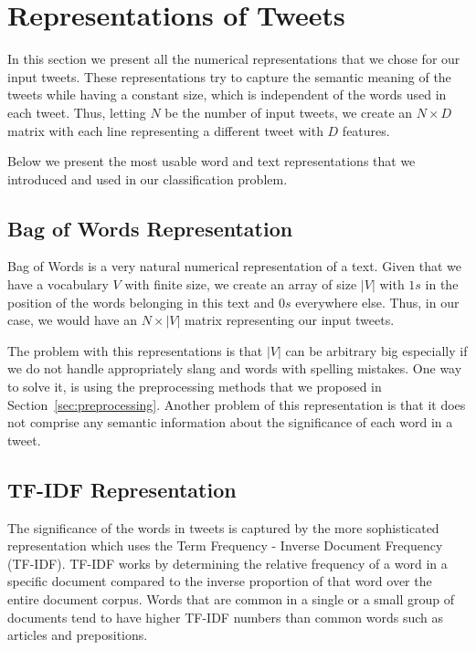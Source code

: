 \section{Representations of Tweets}
\label{sec:tweetRepresentations}

In this section we present all the numerical representations that we chose for our input tweets.
These representations try to capture the semantic meaning of the tweets 
while having a constant size, which is independent of the words used in each tweet.
Thus, letting $N$ be the number of input tweets, we create an $N \times D$ matrix
with each line representing a different tweet with $D$ features.

Below we present the most usable word and text representations that we introduced
and used in our classification problem.

 
 
 
 \subsection{Bag of Words Representation}
 Bag of Words \cite{harris1954distributional} is a very natural numerical representation of a text.
 Given that we have a vocabulary $V$ with finite size, we create
 an array of size $|V|$ with $1s$ in the position of the words belonging in this text and $0s$ everywhere else.
 Thus, in our case, we would have an $N \times |V|$ matrix representing our input tweets.
 
 The problem with this representations is that $|V|$ can be arbitrary big especially if we do not handle appropriately
 slang and words with spelling mistakes.
 One way to solve it, is using the preprocessing methods that we proposed in Section~\ref{sec:preprocessing}. 
 Another problem of this representation is that it does not comprise any semantic information about the significance of each word in a tweet. 
 
  \subsection{TF-IDF Representation}
  
 The significance of the words in tweets is captured by the more sophisticated representation which uses the Term Frequency - Inverse Document Frequency (TF-IDF).
 TF-IDF \cite{sparck1972statistical} works by determining the relative frequency of a word in a specific document compared to the inverse proportion of that word over the entire document corpus.
 Words that are common in a single or a small group of documents tend to have higher TF-IDF numbers than common words such as articles and prepositions. 
 
